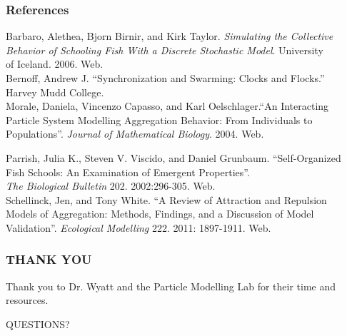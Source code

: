 \documentclass[xcolor=dvipsnames]{beamer}
\begin{document}
\begin{frame}
	\frametitle{References}
	\footnotesize{
	Barbaro, Alethea, Bjorn Birnir, and Kirk Taylor. \textit{Simulating the Collective} \\
	\hspace{0.5cm} \textit{Behavior of Schooling Fish With a Discrete Stochastic Model}. University\\
	\hspace{0.5cm} of Iceland. 2006. Web. \\
	
	\noindent Bernoff, Andrew J. ``Synchronization and Swarming: Clocks and Flocks.'' \\
	\hspace{0.5cm} Harvey Mudd College. \\
	
	\noindent Morale, Daniela, Vincenzo Capasso, and Karl Oelschlager.``An Interacting \\
	\hspace{0.5cm} Particle System Modelling Aggregation Behavior: From Individuals to\\
	\hspace{0.5cm} Populations''. \textit{Journal of Mathematical Biology}. 2004. Web.
	
	\noindent Parrish, Julia K., Steven V. Viscido, and Daniel Grunbaum. ``Self-Organized \\
	\hspace{0.5cm} Fish Schools: An Examination of Emergent Properties''. \\  
	\hspace{0.5cm} \textit{The Biological Bulletin} 202. 2002:296-305. Web. \\
	
	\noindent Schellinck, Jen, and Tony White. ``A Review of Attraction and Repulsion\\
	\hspace{0.5cm} Models of Aggregation: Methods, Findings, and a Discussion of Model \\
	\hspace{0.5cm} Validation''. \textit{Ecological Modelling} 222. 2011: 1897-1911. Web.
	}
\end{frame}

\begin{frame}
	\frametitle{THANK YOU} 
	Thank you to Dr. Wyatt and the Particle Modelling Lab for their time and resources.
	\begin{center}
		\Huge{QUESTIONS?}
	\end{center}
\end{frame}
\end{document}
